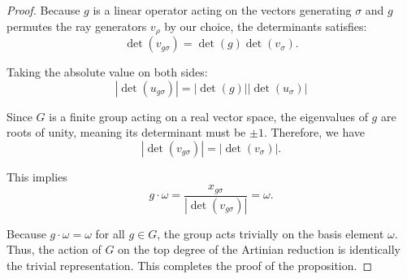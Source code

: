\documentclass{amsart}
\theoremstyle{definition}
\theoremstyle{remark}
\numberwithin{equation}{section}
\begin{document}
\begin{proof}
Because $g$ is a linear operator acting on the vectors generating $\sigma$ and $g$ permutes the ray generators $v_{\rho}$ by our choice, the determinants satisfies:
$$ \det(v_{g\sigma}) = \det(g) \det(v_\sigma). $$

Taking the absolute value on both sides:
$$ |\det(u_{g\sigma})| = |\det(g)| |\det(u_\sigma)| $$

Since $G$ is a finite group acting on a real vector space, the eigenvalues of $g$ are roots of unity, meaning its determinant must be $\pm 1$. Therefore, we have
$$ |\det(v_{g\sigma})| = |\det(v_\sigma)|.$$

This implies
$$ g \cdot \omega = \frac{x_{g\sigma}}{|\det(v_{g\sigma})|} = \omega. $$

Because $g \cdot \omega = \omega$ for all $g \in G$, the group acts trivially on the basis element $\omega$. Thus, the action of $G$ on the top degree of the Artinian reduction is identically the trivial representation. This completes the proof of the proposition.
\end{proof}
\end{document}
